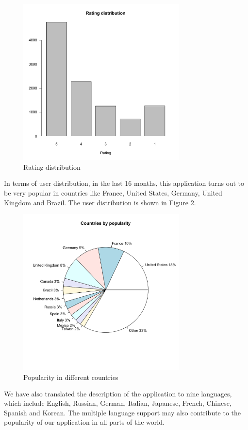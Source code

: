 \begin{figure}[!t]
\centering \includegraphics[height=8.5cm]{charts/rating_distribution}
\caption{Rating distribution\label{ratings}}
\end{figure}
In terms of user distribution, in the last 16 months, this application turns out
to be very popular in countries like France, United States, Germany, United Kingdom
and Brazil. The user distribution is shown in Figure \ref{user_country}.
\begin{figure}[htb]
\centering \includegraphics[height=8.5cm]{charts/country_popularity}
\caption{Popularity in different countries \label{user_country}}
\end{figure}
We have also translated the description of the application to nine languages,
which include English, Russian, German, Italian, Japanese, French, Chinese, Spanish and Korean. The multiple language support may also contribute to the popularity of our application in all parts of the world.
